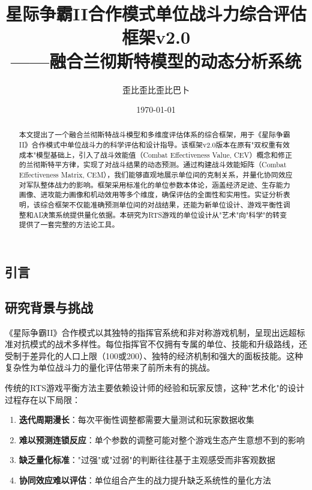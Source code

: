 \documentclass[a4paper,12pt]{article}
\title{\textbf{星际争霸II合作模式单位战斗力综合评估框架v2.0\\——融合兰彻斯特模型的动态分析系统}}
\author{歪比歪比歪比巴卜}
\date{\today}
\begin{document}
\begin{CJK}{UTF8}{gbsn}

\maketitle

\begin{abstract}
\noindent
本文提出了一个融合兰彻斯特战斗模型和多维度评估体系的综合框架，用于《星际争霸II》合作模式中单位战斗力的科学评估和设计指导。该框架v2.0版本在原有"双权重有效成本"模型基础上，引入了战斗效能值（Combat Effectiveness Value, CEV）概念和修正的兰彻斯特平方律，实现了对战斗结果的动态预测。通过构建战斗效能矩阵（Combat Effectiveness Matrix, CEM），我们能够直观地展示单位间的克制关系，并量化协同效应对军队整体战力的影响。框架采用标准化的单位参数本体论，涵盖经济足迹、生存能力画像、进攻能力画像和机动效用等多个维度，确保评估的全面性和实用性。实证分析表明，该综合框架不仅能准确预测单位间的对战结果，还能为新单位设计、游戏平衡性调整和AI决策系统提供量化依据。本研究为RTS游戏的单位设计从"艺术"向"科学"的转变提供了一套完整的方法论工具。
\end{abstract}

\tableofcontents
\newpage

\section{引言}

\subsection{研究背景与挑战}
《星际争霸II》合作模式以其独特的指挥官系统和非对称游戏机制，呈现出远超标准对抗模式的战术多样性。每位指挥官不仅拥有专属的单位、技能和升级路线，还受制于差异化的人口上限（100或200）、独特的经济机制和强大的面板技能。这种复杂性为单位战斗力的量化评估带来了前所未有的挑战。

传统的RTS游戏平衡方法主要依赖设计师的经验和玩家反馈，这种"艺术化"的设计过程存在以下局限：
\begin{enumerate}
\item \textbf{迭代周期漫长}：每次平衡性调整都需要大量测试和玩家数据收集
\item \textbf{难以预测连锁反应}：单个参数的调整可能对整个游戏生态产生意想不到的影响
\item \textbf{缺乏量化标准}："过强"或"过弱"的判断往往基于主观感受而非客观数据
\item \textbf{协同效应难以评估}：单位组合产生的战力提升缺乏系统性的量化方法
\end{enumerate}


\end{CJK}
\end{document}
